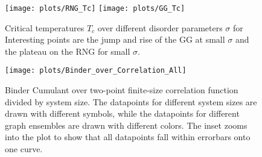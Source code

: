 \begin{figure}[hbtp]
    \centering
    \texttt{[image: plots/RNG\_Tc]}
    \texttt{[image: plots/GG\_Tc]}
    \caption[Critical Temperature over Different Disorder Parameters]
    {
        Critical temperatures \(T_c\) over different
        disorder parameters \(\sigma\) for
        Interesting points are the jump and rise of the GG at small
        \(\sigma\) and the plateau on the RNG for small \(\sigma\).
    }
    \label{fig:Tc}
\end{figure}

\begin{figure}[hbtp]
    \centering
    \texttt{[image: plots/Binder\_over\_Correlation\_All]}
    \caption[Binder Cumulant over two-point finite-size correlation function divided by system size]
    {
        Binder Cumulant over two-point finite-size correlation function
        divided by system size. The datapoints for different system sizes
        are drawn with different symbols, while the datapoints for different
        graph ensembles are drawn with different colors.
        The inset zooms into the plot to show that
        all datapoints fall within errorbars onto one curve.
    }
    \label{fig:binderOverCorr}
\end{figure}
